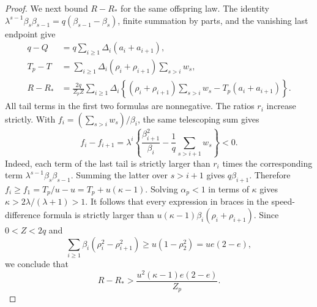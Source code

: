 \begin{proof}
We next bound $R-R_*$ for the same offspring law. The identity
$\lambda^{s-1}\beta_s\beta_{s-1}=q(\beta_{s-1}-\beta_s)$,
finite summation by parts, and the vanishing last endpoint give
\begin{align*}
 q-Q&=q\sum_{i\ge1}\Delta_i(a_i+a_{i+1}),\\
 T_p-T&=\sum_{i\ge1}\Delta_i(\rho_i+\rho_{i+1})
                              \sum_{s>i}w_s,\\
 R-R_*&=\frac{2q}{Z_p Z}\sum_{i\ge1}\Delta_i
 \left\{(\rho_i+\rho_{i+1})\sum_{s>i}w_s-T_p(a_i+a_{i+1})\right\}.
\end{align*}
All tail terms in the first two formulas are nonnegative.  The ratios
$r_i$ increase strictly.  With $f_i=(\sum_{s>i}w_s)/\beta_i$, the same
telescoping sum gives
\[
 f_i-f_{i+1}=\lambda^i
 \left\{\frac{\beta_{i+1}^2}{\beta_i}
               -\frac1q\sum_{s>i+1}w_s\right\}<0.
\]
Indeed, each term of the last tail is strictly larger than $r_i$
times the corresponding term $\lambda^{s-1}\beta_s\beta_{s-1}$.
Summing the latter over $s>i+1$ gives $q\beta_{i+1}$. Therefore
$f_i\ge f_1=T_p/u-u=T_p+u(\kappa-1)$.
Solving $\alpha_p<1$ in terms of $\kappa$ gives
$\kappa>2\lambda/(\lambda+1)>1$.  It follows that every expression
in braces in the speed-difference formula is strictly larger than
$u(\kappa-1)\beta_i(\rho_i+\rho_{i+1})$.
Since $0<Z<2q$ and
\[
 \sum_{i\ge1}\beta_i(\rho_i^2-\rho_{i+1}^2)
 \ge u(1-\rho_2^2)=ue(2-e),
\]
we conclude that
\begin{equation}\label{eq:low-speed-deficit}
 R-R_*>\frac{u^2(\kappa-1)e(2-e)}{Z_p}.
\end{equation}


\end{proof}
